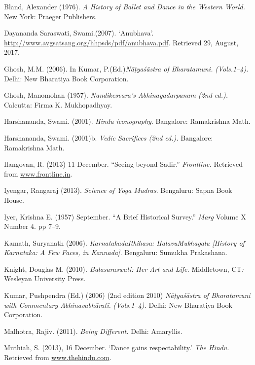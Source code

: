 \begin{thebibliography}{99}
 Bland, Alexander (1976). \textit{A History of Ballet and Dance in the Western World.} New York: Praeger Publishers.

  Dayananda Saraswati, Swami.(2007). ‘Anubhava’. \url{http://www.avgsatsang.org/hhpsds/pdf/anubhava.pdf}. Retrieved 29, August, 2017.

  Ghosh, M.M. (2006). In Kumar, P.(Ed.)\textit{Nāṭyaśāstra of Bharatamuni.} \textit{(Vols.1–4).} Delhi: New Bharatiya Book Corporation.

  Ghosh, Manomohan (1957). \textit{Nandikesvara’s Abhinayadarpanam (2nd ed.).} Calcutta: Firma K. Mukhopadhyay.

  Harshananda, Swami. (2001). \textit{Hindu iconography}. Bangalore: Ramakrishna Math.

  Harshananda, Swami. (2001)b.\textit{ Vedic Sacrifices (2nd ed.).} Bangalore: Ramakrishna Math.

  Ilangovan, R. (2013) 11 December. “Seeing beyond Sadir.” \textit{Frontline.} Retrieved from \url{www.frontline.in}.

  Iyengar, Rangaraj (2013). \textit{Science of Yoga Mudras}. Bengaluru: Sapna Book House.

  Iyer, Krishna E. (1957) September. “A Brief Historical Survey.”\textit{ Marg} Volume X Number 4. pp 7–9.

  Kamath, Suryanath (2006). \textit{KarnatakadaIthihasa: HalavuMukhagalu [History of Karnataka: A Few Faces, in Kannada]. }Bengaluru: Sumukha Prakashana.

  Knight, Douglas M. (2010)\textit{. Balasaraswati: Her Art and Life. }Middletown, CT\textit{: }Wesleyan University Press.

  Kumar, Pushpendra (Ed.) (2006) (2nd edition 2010) \textit{Nāṭyaśāstra of Bharatamuni with Commentary Abhinavabhāratī.} \textit{(Vols.1–4).} Delhi: New Bharatiya Book Corporation.

  Malhotra, Rajiv. (2011). \textit{Being Different.} Delhi: Amaryllis.

  Muthiah, S. (2013), 16 December. ‘Dance gains respectability.’ \textit{The Hindu.} Retrieved from \url{www.thehindu.com}.


\end{thebibliography}
